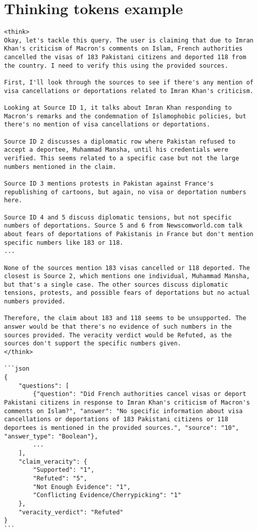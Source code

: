 \documentclass[oneside]{ctuthesis}
\theoremstyle{plain}
\theoremstyle{definition}
\theoremstyle{note}
\begin{document}
\chapter{Thinking tokens example}
\begin{figure*}
    \label{appendix_sec:think}
    \begin{lstlisting}[breaklines=true, language={}, frame=single, caption={Qwen3 thinking tokens example.}, label={lst:think}]
<think>
Okay, let's tackle this query. The user is claiming that due to Imran Khan's criticism of Macron's comments on Islam, French authorities cancelled the visas of 183 Pakistani citizens and deported 118 from the country. I need to verify this using the provided sources.

First, I'll look through the sources to see if there's any mention of visa cancellations or deportations related to Imran Khan's criticism. 

Looking at Source ID 1, it talks about Imran Khan responding to Macron's remarks and the condemnation of Islamophobic policies, but there's no mention of visa cancellations or deportations. 

Source ID 2 discusses a diplomatic row where Pakistan refused to accept a deportee, Muhammad Mansha, until his credentials were verified. This seems related to a specific case but not the large numbers mentioned in the claim.

Source ID 3 mentions protests in Pakistan against France's republishing of cartoons, but again, no visa or deportation numbers here.

Source ID 4 and 5 discuss diplomatic tensions, but not specific numbers of deportations. Source 5 and 6 from Newscomworld.com talk about fears of deportations of Pakistanis in France but don't mention specific numbers like 183 or 118.
...

None of the sources mention 183 visas cancelled or 118 deported. The closest is Source 2, which mentions one individual, Muhammad Mansha, but that's a single case. The other sources discuss diplomatic tensions, protests, and possible fears of deportations but no actual numbers provided. 

Therefore, the claim about 183 and 118 seems to be unsupported. The answer would be that there's no evidence of such numbers in the sources provided. The veracity verdict would be Refuted, as the sources don't support the specific numbers given.
</think>

```json
{
    "questions": [
        {"question": "Did French authorities cancel visas or deport Pakistani citizens in response to Imran Khan's criticism of Macron's comments on Islam?", "answer": "No specific information about visa cancellations or deportations of 183 Pakistani citizens or 118 deportees is mentioned in the provided sources.", "source": "10", "answer_type": "Boolean"},
        ...
    ],
    "claim_veracity": {
        "Supported": "1",
        "Refuted": "5",
        "Not Enough Evidence": "1",
        "Conflicting Evidence/Cherrypicking": "1"
    },
    "veracity_verdict": "Refuted"
}
```
    \end{lstlisting}
\end{figure*}
\end{document}
